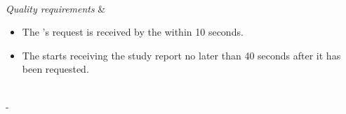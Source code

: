 \begin{table}[H]
\begin{tabu}
\begin{itemize}[leftmargin=*,topsep=0pt,itemsep=-1ex]
	\end{itemize} \\
	\hline
	\textit{Quality \newline requirements} &
	\vspace{-3mm}
	\begin{itemize}[leftmargin=*,topsep=0pt,itemsep=-1ex]
		\item The \client's request is received by the \serverside within 10 seconds.
		\item The \client  starts receiving the study report no later than 40 seconds after it has been requested.
	\end{itemize} \\
	\tabucline[1.5pt]-
\end{tabu}
\caption{Use case: ExportProtocol}
\label{uc:ExportProtocol}
\end{table}